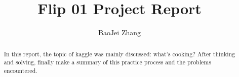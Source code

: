 \documentclass{amsart}
\begin{document}
%
%
\title[A Short Running Title]{Flip 01 Project Report}%

\author{BaoJei Zhang}




%
\date{\gitAuthorDate}%

\begin{abstract}
    In this report, the topic of kaggle was mainly discussed: 
    what's cooking? After thinking and solving, finally make 
    a summary of this practice process and the problems encountered.
\end{abstract}

\maketitle
\tableofcontents

\newpage



\newpage



\end{document}
